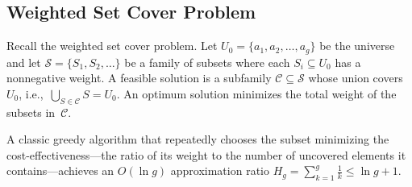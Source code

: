 \subsection{Weighted Set Cover Problem}
\label{subsec: set covering problem}

Recall the weighted set cover problem. Let $U_0=\{a_1,a_2,\dots,a_g\}$ be the universe and let $\mathcal{S}=\{S_1,S_2,\dots\}$ be a family of subsets where each $S_i\subseteq U_0$ has a nonnegative weight.
A feasible solution is a subfamily $\mathcal{C}\subseteq \mathcal{S}$ whose union covers $U_0$, i.e.,~$\bigcup_{S\in\mathcal{C}} S=U_0$. An optimum solution minimizes the total weight of the subsets in~$\mathcal{C}$.

A classic greedy algorithm that repeatedly chooses the subset minimizing the cost-effectiveness---the ratio of its weight to the number of uncovered elements it contains---achieves an $O(\ln g)$ approximation ratio $H_g=\sum_{k=1}^g \tfrac{1}{k}\le \ln g+1$.
